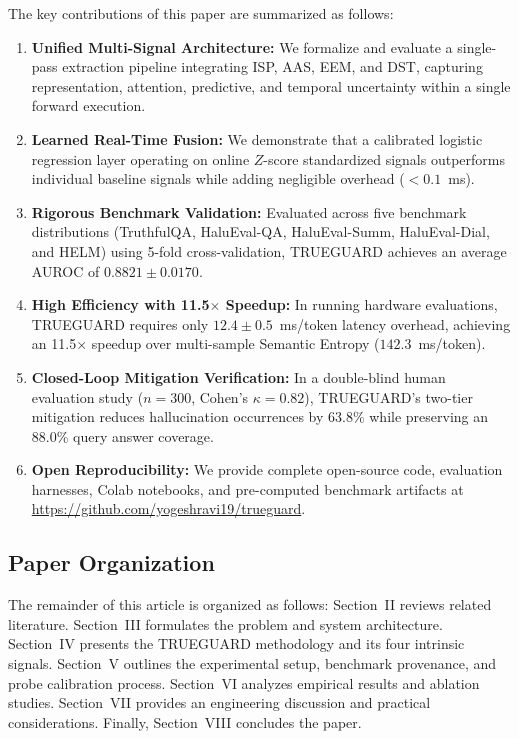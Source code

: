 \documentclass[journal]{IEEEtran}
\begin{document}
The key contributions of this paper are summarized as follows:
\begin{enumerate}
    \item \textbf{Unified Multi-Signal Architecture:} We formalize and evaluate a single-pass extraction pipeline integrating ISP, AAS, EEM, and DST, capturing representation, attention, predictive, and temporal uncertainty within a single forward execution.
    \item \textbf{Learned Real-Time Fusion:} We demonstrate that a calibrated logistic regression layer operating on online $Z$-score standardized signals outperforms individual baseline signals while adding negligible overhead ($<0.1$~ms).
    \item \textbf{Rigorous Benchmark Validation:} Evaluated across five benchmark distributions (TruthfulQA, HaluEval-QA, HaluEval-Summ, HaluEval-Dial, and HELM) using 5-fold cross-validation, TRUEGUARD achieves an average AUROC of $0.8821 \pm 0.0170$.
    \item \textbf{High Efficiency with 11.5$\times$ Speedup:} In running hardware evaluations, TRUEGUARD requires only $12.4 \pm 0.5$~ms/token latency overhead, achieving an 11.5$\times$ speedup over multi-sample Semantic Entropy ($142.3$~ms/token).
    \item \textbf{Closed-Loop Mitigation Verification:} In a double-blind human evaluation study ($n = 300$, Cohen's $\kappa = 0.82$), TRUEGUARD's two-tier mitigation reduces hallucination occurrences by 63.8\% while preserving an 88.0\% query answer coverage.
    \item \textbf{Open Reproducibility:} We provide complete open-source code, evaluation harnesses, Colab notebooks, and pre-computed benchmark artifacts at \url{https://github.com/yogeshravi19/trueguard}.
\end{enumerate}

\subsection{Paper Organization}
The remainder of this article is organized as follows: Section~II reviews related literature. Section~III formulates the problem and system architecture. Section~IV presents the TRUEGUARD methodology and its four intrinsic signals. Section~V outlines the experimental setup, benchmark provenance, and probe calibration process. Section~VI analyzes empirical results and ablation studies. Section~VII provides an engineering discussion and practical considerations. Finally, Section~VIII concludes the paper.
\end{document}

